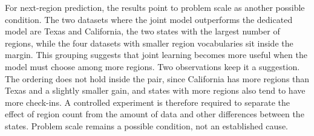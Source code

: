 For next-region prediction, the results point to problem scale as another possible
condition. The two datasets where the joint model outperforms the dedicated model are
Texas and California, the two states with the largest number of regions, while the four
datasets with smaller region vocabularies sit inside the margin. This grouping suggests
that joint learning becomes more useful when the model must choose among more regions.
Two observations keep it a suggestion. The ordering does not hold inside the pair, since
California has more regions than Texas and a slightly smaller gain, and states with more
regions also tend to have more check-ins. A controlled
experiment is therefore required to separate the effect of region count from the amount
of data and other differences between the states. Problem scale remains a possible
condition, not an established cause.



